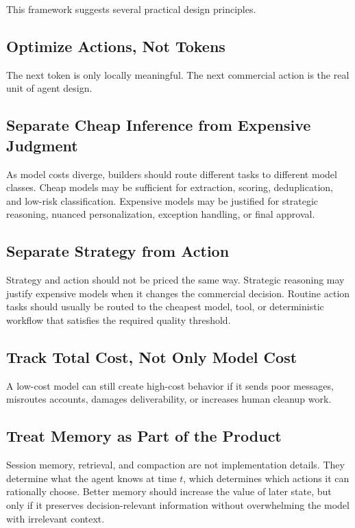 \documentclass[12pt]{article}
\begin{document}
This framework suggests several practical design principles.

\subsection{Optimize Actions, Not Tokens}

The next token is only locally meaningful. The next commercial action is the real
unit of agent design.

\subsection{Separate Cheap Inference from Expensive Judgment}

As model costs diverge, builders should route different tasks to different model
classes. Cheap models may be sufficient for extraction, scoring, deduplication,
and low-risk classification. Expensive models may be justified for strategic
reasoning, nuanced personalization, exception handling, or final approval.

\subsection{Separate Strategy from Action}

Strategy and action should not be priced the same way. Strategic reasoning may
justify expensive models when it changes the commercial decision. Routine action
tasks should usually be routed to the cheapest model, tool, or deterministic
workflow that satisfies the required quality threshold.

\subsection{Track Total Cost, Not Only Model Cost}

A low-cost model can still create high-cost behavior if it sends poor messages,
misroutes accounts, damages deliverability, or increases human cleanup work.

\subsection{Treat Memory as Part of the Product}

Session memory, retrieval, and compaction are not implementation details. They
determine what the agent knows at time \(t\), which determines which actions it
can rationally choose. Better memory should increase the value of later state,
but only if it preserves decision-relevant information without overwhelming the
model with irrelevant context.
\end{document}
